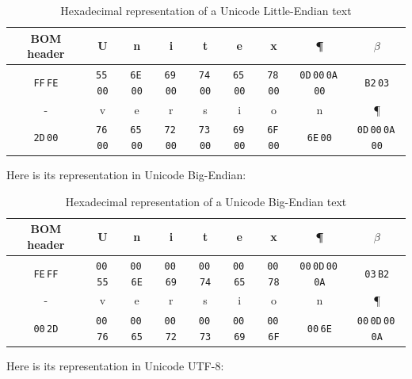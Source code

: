 \bigskip
\begin{table}[h]
\begin{center}
\begin{tabular}{|c|c|c|c|c|c|c|c|c|}
\hline
BOM header & U & n & i & t & e & x & \P & $\beta$
\\
\hline
\verb+FF+\,\verb+FE+ & \verb+55+\,\verb+00+ & \verb+6E+\,\verb+00+ & \verb+69+\,\verb+00+ & \verb+74+\,\verb+00+ & \verb+65+\,\verb+00+ & \verb+78+\,\verb+00+
& \verb+0D+\,\verb+00+\,\verb+0A+\,\verb+00+ & \verb+B2+\,\verb+03+
\\
\hline
\hline
- & v & e & r & s & i & o & n & \P
\\
\hline
\verb+2D+\,\verb+00+ & \verb+76+\,\verb+00+ & \verb+65+\,\verb+00+ & \verb+72+\,\verb+00+ & \verb+73+\,\verb+00+ & \verb+69+\,\verb+00+ & \verb+6F+\,\verb+00+
& \verb+6E+\,\verb+00+ & \verb+0D+\,\verb+00+\,\verb+0A+\,\verb+00+
\\
\hline
\end{tabular}
\caption{Hexadecimal representation of a Unicode Little-Endian text}
\end{center}
\end{table}

\bigskip
\noindent Here is its representation in Unicode Big-Endian:

\bigskip
\begin{table}[h]
\begin{center}
\begin{tabular}{|c|c|c|c|c|c|c|c|c|}
\hline
BOM header & U & n & i & t & e & x & \P & $\beta$
\\
\hline
\verb+FE+\,\verb+FF+ & \verb+00+\,\verb+55+ & \verb+00+\,\verb+6E+ & \verb+00+\,\verb+69+ & \verb+00+\,\verb+74+ & \verb+00+\,\verb+65+ & \verb+00+\,\verb+78+
& \verb+00+\,\verb+0D+\,\verb+00+\,\verb+0A+ & \verb+03+\,\verb+B2+
\\
\hline
\hline
- & v & e & r & s & i & o & n & \P
\\
\hline
\verb+00+\,\verb+2D+ & \verb+00+\,\verb+76+ & \verb+00+\,\verb+65+ & \verb+00+\,\verb+72+ & \verb+00+\,\verb+73+ & \verb+00+\,\verb+69+ & \verb+00+\,\verb+6F+
& \verb+00+\,\verb+6E+ & \verb+00+\,\verb+0D+\,\verb+00+\,\verb+0A+
\\
\hline
\end{tabular}
\caption{Hexadecimal representation of a Unicode Big-Endian text}
\end{center}
\end{table}

\bigskip
\noindent Here is its representation in Unicode UTF-8:

